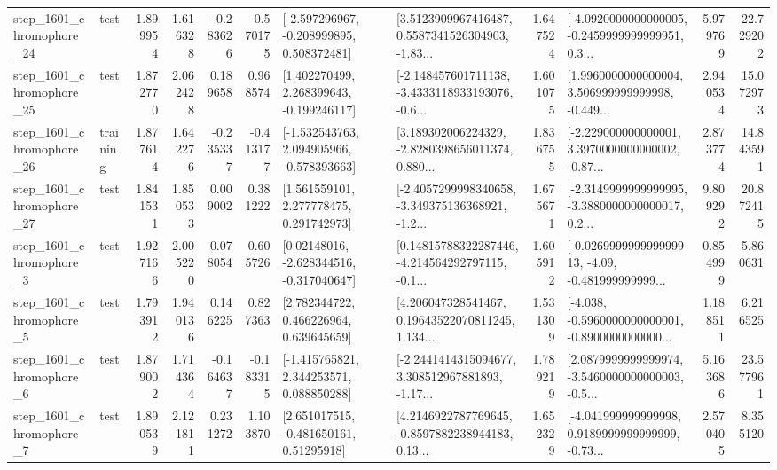 \begin{tabular}{llrrrrllrlrr}
 step\_1601\_chromophore\_24 &      test &      1.899954 &    1.616328 &     -0.283626 & -0.570175 &   [-2.597296967, -0.208999895, 0.508372481] &  [3.5123909967416487, 0.5587341526304903, -1.83... &       1.647524 &  [-4.0920000000000005, -0.2459999999999951, 0.3... &            5.979769 &         22.729202 \\
 step\_1601\_chromophore\_25 &      test &      1.872770 &    2.062428 &      0.189658 &  0.968574 &    [1.402270499, 2.268399643, -0.199246117] &  [-2.148457601711138, -3.4333118933193076, -0.6... &       1.601075 &  [1.9960000000000004, 3.506999999999998, -0.449... &            2.940534 &         15.072973 \\
 step\_1601\_chromophore\_26 &  training &      1.877614 &    1.642276 &     -0.235337 & -0.413177 &   [-1.532543763, 2.094905966, -0.578393663] &  [3.189302006224329, -2.8280398656011374, 0.880... &       1.836755 &  [-2.229000000000001, 3.3970000000000002, -0.87... &            2.873774 &         14.843591 \\
 step\_1601\_chromophore\_27 &      test &      1.841531 &    1.850533 &      0.009002 &  0.381222 &     [1.561559101, 2.277778475, 0.291742973] &  [-2.4057299998340658, -3.349375136368921, -1.2... &       1.675671 &  [-2.3149999999999995, -3.3880000000000017, 0.2... &            9.809292 &         20.872415 \\
  step\_1601\_chromophore\_3 &      test &      1.927166 &    2.005220 &      0.078054 &  0.605726 &    [0.02148016, -2.628344516, -0.317040647] &  [0.14815788322287446, -4.214564292797115, -0.1... &       1.605912 &  [-0.026999999999999913, -4.09, -0.481999999999... &            0.854999 &          5.860631 \\
  step\_1601\_chromophore\_5 &      test &      1.793912 &    1.940136 &      0.146225 &  0.827363 &     [2.782344722, 0.466226964, 0.639645659] &  [4.206047328541467, 0.19643522070811245, 1.134... &       1.531309 &  [-4.038, -0.5960000000000001, -0.8900000000000... &            1.188511 &          6.216525 \\
  step\_1601\_chromophore\_6 &      test &      1.879002 &    1.714364 &     -0.164637 & -0.183315 &    [-1.415765821, 2.344253571, 0.088850288] &  [-2.2441414315094677, 3.308512967881893, -1.17... &       1.789219 &  [2.0879999999999974, -3.5460000000000003, -0.5... &            5.163686 &         23.577961 \\
  step\_1601\_chromophore\_7 &      test &      1.890539 &    2.121811 &      0.231272 &  1.103870 &     [2.651017515, -0.481650161, 0.51295918] &  [4.2146922787769645, -0.8597882238944183, 0.13... &       1.652329 &  [-4.041999999999998, 0.9189999999999999, -0.73... &            2.570405 &          8.355120 \\

\end{tabular}
